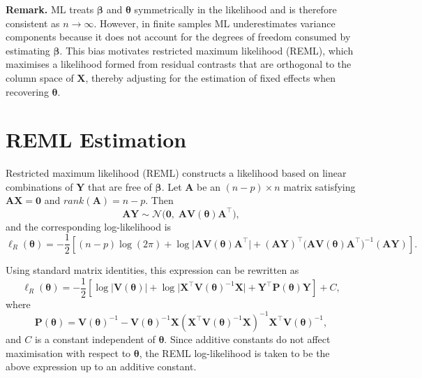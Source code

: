 \documentclass[
  letterpaper,
  DIV=11,
  numbers=noendperiod]{scrartcl}
\begin{document}
\noindent\textbf{Remark.} ML treats \(\symbf{\beta}\) and
\(\symbf{\theta}\) symmetrically in the likelihood and is therefore
consistent as \(n \to \infty\). However, in finite samples ML
underestimates variance components because it does not account for the
degrees of freedom consumed by estimating \(\symbf{\beta}\). This bias
motivates restricted maximum likelihood (REML), which maximises a
likelihood formed from residual contrasts that are orthogonal to the
column space of \(\symbf{X}\), thereby adjusting for the estimation of
fixed effects when recovering \(\symbf{\theta}\).

\section{REML Estimation}\label{reml-estimation}

Restricted maximum likelihood (REML) constructs a likelihood based on
linear combinations of \(\symbf{Y}\) that are free of \(\symbf{\beta}\).
Let \(\symbf{A}\) be an \((n-p)\times n\) matrix satisfying
\(\symbf{A}\symbf{X}=\symbf{0}\) and \(rank(\symbf{A})=n-p\). Then
\begin{equation}
\symbf{AY} \sim \mathcal{N}\big(\symbf{0},\; \symbf{A}\symbf{V}(\symbf{\theta})\symbf{A}^\top\big),
\end{equation} and the corresponding log-likelihood is \begin{equation}
\ell_R(\symbf{\theta})
=
-\frac{1}{2}\left[
(n-p)\log(2\pi)
+ \log\big|\symbf{A}\symbf{V}(\symbf{\theta})\symbf{A}^\top\big|
+ (\symbf{AY})^\top \big(\symbf{A}\symbf{V}(\symbf{\theta})\symbf{A}^\top\big)^{-1} (\symbf{AY})
\right].
\end{equation}

Using standard matrix identities, this expression can be rewritten as
\begin{equation}
\boxed{
\ell_R(\symbf{\theta})
=
-\frac{1}{2}\left[
\log\big|\symbf{V}(\symbf{\theta})\big|
+ \log\big|\symbf{X}^\top \symbf{V}(\symbf{\theta})^{-1} \symbf{X}\big|
+ \symbf{Y}^\top \symbf{P}(\symbf{\theta}) \symbf{Y}
\right]
+ C
},
\end{equation} where \begin{equation}
\boxed{
\symbf{P}(\symbf{\theta})
=
\symbf{V}(\symbf{\theta})^{-1}
-
\symbf{V}(\symbf{\theta})^{-1}\symbf{X}
\left(
\symbf{X}^\top \symbf{V}(\symbf{\theta})^{-1}\symbf{X}
\right)^{-1}
\symbf{X}^\top \symbf{V}(\symbf{\theta})^{-1}
},
\end{equation} and \(C\) is a constant independent of
\(\symbf{\theta}\). Since additive constants do not affect maximisation
with respect to \(\symbf{\theta}\), the REML log-likelihood is taken to
be the above expression up to an additive constant.
\end{document}
